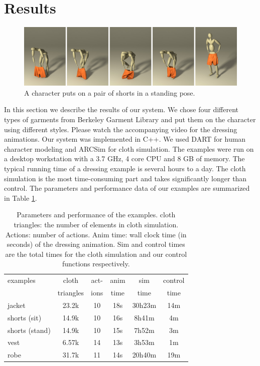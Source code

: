 \section{Results}



\begin{figure}[!t]
  \centering
  \includegraphics[width=\textwidth]{images/shortsStanding}
  \caption{A character puts on a pair of shorts in a standing pose.}
  \label{fig:shorts2}
\end{figure}
In this section we describe the results of our system. We chose four different types of garments from Berkeley Garment Library and put them on the character using different styles. Please watch the accompanying video for the dressing animations. Our system was implemented in C++. We used DART \cite{Liu:2012:STM} for human character modeling and ARCSim \cite{Narain:2012:AAR} for cloth simulation. The examples were run on a desktop workstation with a 3.7 GHz, 4 core CPU and 8 GB of memory. The typical running time of a dressing example is several hours to a day. The cloth simulation is the most time-consuming part and takes significantly longer than control. The parameters and performance data of our examples are summarized in Table
 \ref{table:data}. 

\begin{table}
  \centering
  \begin{tabular}{|l|c|c|c|c|c|}
    \hline
    examples 		& cloth 	& act- 	& anim	& sim 		& control \\
                        & triangles & 	ions	& time 	& time 		& time \\
    \hline
    jacket 		& 23.2k  	& 10		& 18s 	&30h23m	&  14m  \\
    shorts (sit) 	& 14.9k 	& 10		& 16s 	&  8h41m 	& 4m \\
    shorts (stand)	& 14.9k 	& 10		& 15s	&  7h52m	& 3m \\
    vest 		& 6.57k		& 14		& 13s	&  3h53m	& 1m   \\
    robe 		& 31.7k 	& 11		& 14s			& 20h40m		& 19m  \\
    \hline
  \end{tabular}
  \caption{Parameters and performance of the examples. cloth triangles: the number of elements in cloth simulation. Actions: number of actions. Anim time: wall clock time (in seconds) of the dressing animation. Sim and control times are the total times for the cloth simulation and our control functions respectively.}
  \label{table:data}
\end{table}

